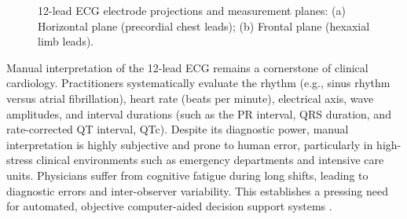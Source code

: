 \documentclass[12pt,a4paper]{report}
\begin{document}
\begin{figure}[H]
\caption{12-lead ECG electrode projections and measurement planes: (a) Horizontal plane (precordial chest leads); (b) Frontal plane (hexaxial limb leads).}
\label{fig:ecg_lead_projections}
\end{figure}


Manual interpretation of the 12-lead ECG remains a cornerstone of clinical cardiology. Practitioners systematically evaluate the rhythm (e.g., sinus rhythm versus atrial fibrillation), heart rate (beats per minute), electrical axis, wave amplitudes, and interval durations (such as the PR interval, QRS duration, and rate-corrected QT interval, QTc). Despite its diagnostic power, manual interpretation is highly subjective and prone to human error, particularly in high-stress clinical environments such as emergency departments and intensive care units. Physicians suffer from cognitive fatigue during long shifts, leading to diagnostic errors and inter-observer variability. This establishes a pressing need for automated, objective computer-aided decision support systems \cite{hannun2019cardiologist, ebrahimi2020review, whocvd}.
\end{document}
